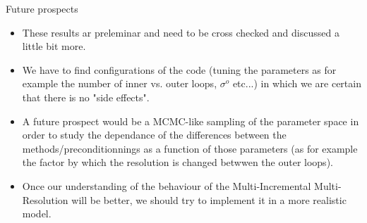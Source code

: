 \documentclass[8pt]{beamer}
\begin{document}
\begin{frame}{Future prospects}
\begin{itemize}
\item These results ar preleminar and need to be cross checked and discussed a little bit more.
\item We have to find configurations of the code (tuning the parameters as for example the number of inner vs. outer loops, $\sigma^o$ etc...) in which we are certain that there is no "side effects".
\item A future prospect would be a MCMC-like sampling of the parameter space in order to study the dependance of the differences between the methods/preconditionnings as a function of those parameters (as for example the factor by which the resolution is changed betwwen the outer loops).
\item Once our understanding of the behaviour of the Multi-Incremental Multi-Resolution will be better, we should try to implement it in a more realistic model.
\end{itemize}
\end{frame}

\usebackgroundtemplate{}
\end{document}
